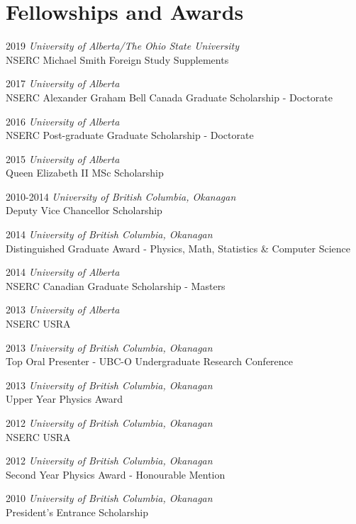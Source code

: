 \documentclass[letterpaper,11pt]{article}
\newlength{\mainindent} \setlength{\mainindent}{12pt}
\newlength{\contentindent} \setlength{\contentindent}{19ex}
\newenvironment{datelist}{
  \begingroup
  \raggedright
  \begin{description}[labelindent=\mainindent,leftmargin=\contentindent,
      style=sameline,font=\normalfont,topsep=0pt,partopsep=0pt,parsep=0pt,
      itemsep=4pt]
}{
  \end{description}
  \endgroup
}
\begin{document}
\section*{Fellowships and Awards}
\begin{datelist}
\item[2019] \emph{University of Alberta/The Ohio State University} \\ NSERC Michael Smith Foreign Study Supplements
\item[2017] \emph{University of Alberta} \\ NSERC Alexander Graham Bell Canada Graduate Scholarship - Doctorate
\item[2016] \emph{University of Alberta} \\ NSERC Post-graduate Graduate Scholarship - Doctorate
\item[2015] \emph{University of Alberta} \\ Queen Elizabeth II MSc Scholarship
\item[2010-2014] \emph{University of British Columbia, Okanagan} \\ Deputy Vice Chancellor Scholarship
\item[2014] \emph{University of British Columbia, Okanagan} \\ Distinguished Graduate Award - Physics, Math, Statistics \& Computer Science
\item[2014] \emph{University of Alberta} \\ NSERC Canadian Graduate Scholarship - Masters
\item[2013] \emph{University of Alberta} \\ NSERC USRA
\item[2013] \emph{University of British Columbia, Okanagan} \\ Top Oral Presenter - UBC-O Undergraduate Research Conference
\item[2013] \emph{University of British Columbia, Okanagan} \\ Upper Year Physics Award
\item[2012] \emph{University of British Columbia, Okanagan} \\ NSERC USRA
\item[2012] \emph{University of British Columbia, Okanagan} \\ Second Year Physics Award - Honourable Mention
\item[2010] \emph{University of British Columbia, Okanagan} \\ President's Entrance Scholarship
\end{datelist}
\end{document}
